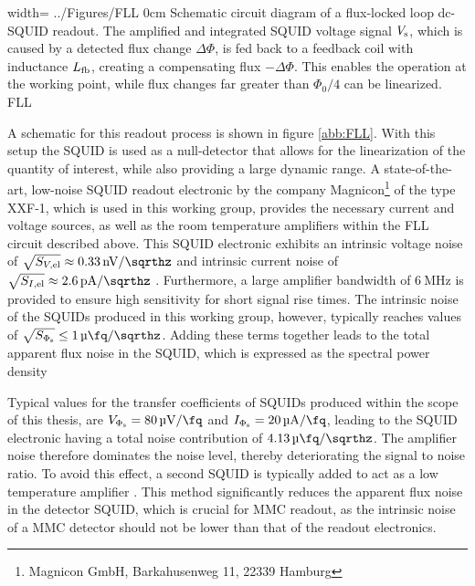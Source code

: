 {width=\textwidth}
{../Figures/FLL}
{0cm}
{Schematic circuit diagram of a flux-locked loop dc-SQUID readout. The amplified and integrated SQUID voltage signal $V_{\rm s}$, which is caused by a detected flux change $\Delta\Phi$, is fed back to a feedback coil with inductance $L_{\rm fb}$, creating a compensating flux $-\Delta\Phi$. This enables the operation at the working point, while flux changes far greater than $\Phi_0/4$ can be linearized.} 
{FLL}

A schematic for this readout process is shown in figure \ref{abb:FLL}.  With this setup the SQUID is used as a null-detector that allows for the linearization of the quantity of interest, while also providing a large dynamic range. A state-of-the-art, low-noise SQUID readout electronic by the company Magnicon\footnote{Magnicon GmbH, Barkahusenweg 11, 22339 Hamburg} of the type XXF-1, which is used in this working group, provides the necessary current and voltage sources, as well as the room temperature amplifiers within the FLL circuit described above. This SQUID electronic exhibits an intrinsic voltage noise of $\sqrt{S_{V\rm ,el}}\approx\qty{0.33}{\nV\per\sqrthz}$ and intrinsic current noise of $\sqrt{S_{I\rm ,el}}\approx\qty{2.6}{\pA\per\sqrthz}$ \cite{Drung2006}. Furthermore, a large amplifier bandwidth of $\qty{6}{\MHz}$ is provided to ensure high sensitivity for short signal rise times. The intrinsic noise of the SQUIDs produced in this working group, however, typically reaches values of $\sqrt{S_{\Phi_{\rm s}}}\leq\qty{1}{\micro\fq\per\sqrthz}$. Adding these terms together leads to the total apparent flux noise in the SQUID, which is expressed as the spectral power density


Typical values for the transfer coefficients of SQUIDs produced within the scope of this thesis, are $V_{\rm \Phi_s}=\qty{80}{\uV\per\fq}$ and $I_{\rm \Phi_s}=\qty{20}{\uA\per\fq}$, leading to the SQUID electronic having a total noise contribution of $\qty{4.13}{\micro\fq\per\sqrthz}$. The amplifier noise therefore dominates the noise level, thereby deteriorating the signal to noise ratio. To avoid this effect, a second SQUID is typically added to act as a low temperature amplifier \cite{Welty1993}. This method significantly reduces the apparent flux noise in the detector SQUID, which is crucial for MMC readout, as the intrinsic noise of a MMC detector should not be lower than that of the readout electronics.


